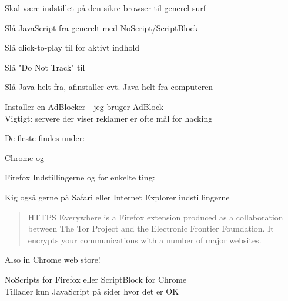 \documentclass[20pt,landscape,a4paper]{foils}
\begin{document}

\begin{list1}
\item Skal være indstillet på den sikre browser til generel surf
\begin{list2}
\item Slå JavaScript fra generelt med NoScript/ScriptBlock
\item Slå click-to-play til for aktivt indhold
\item Slå "Do Not Track" til
\item Slå Java helt fra, afinstaller evt. Java helt fra computeren
\item Installer en AdBlocker - jeg bruger AdBlock\\
Vigtigt: servere der viser reklamer er ofte mål for hacking
\end{list2}
\end{list1}



De fleste findes under:
\begin{list2}
\item Chrome  og 
\item Firefox Indstillingerne og for enkelte ting: 
\end{list2}

\centerline{Kig også gerne på Safari eller Internet Explorer indstillingerne}




\begin{quote}
HTTPS Everywhere is a Firefox extension produced as a collaboration between The Tor Project and the Electronic Frontier Foundation. It encrypts your communications with a number of major websites.
\end{quote}

\centerline{}

Also in Chrome web store!




\vskip 2cm
NoScripts for Firefox eller ScriptBlock for Chrome\\
Tillader kun JavaScript på sider hvor det er OK
\end{document}
